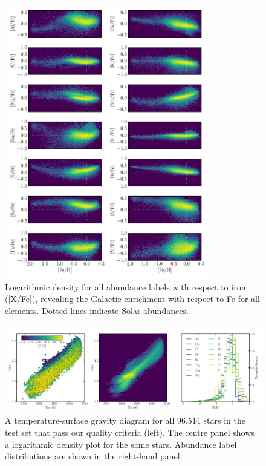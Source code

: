 \documentclass[12pt,preprint]{aastex}
\begin{document}
\begin{figure}[p]
\centering
\includegraphics[width=0.8\textwidth]{test-step-gce.pdf}
\caption{Logarithmic density for all abundance labels with respect to iron ([X/Fe]), revealing the Galactic  enrichment with respect to Fe for all elements. Dotted lines indicate Solar abundances.\label{fig:gce}}
\end{figure}

\clearpage

\begin{figure}[p]
\includegraphics[width=\textwidth]{test_set_hrd.pdf}
\caption{A temperature-surface gravity diagram for all 96,514 stars in the test set that pass our quality criteria (left). The centre panel shows a logarithmic density plot for the same stars. Abundance label distributions are shown in the right-hand panel.\label{fig:test set-hrd}}
\end{figure}
\end{document}
